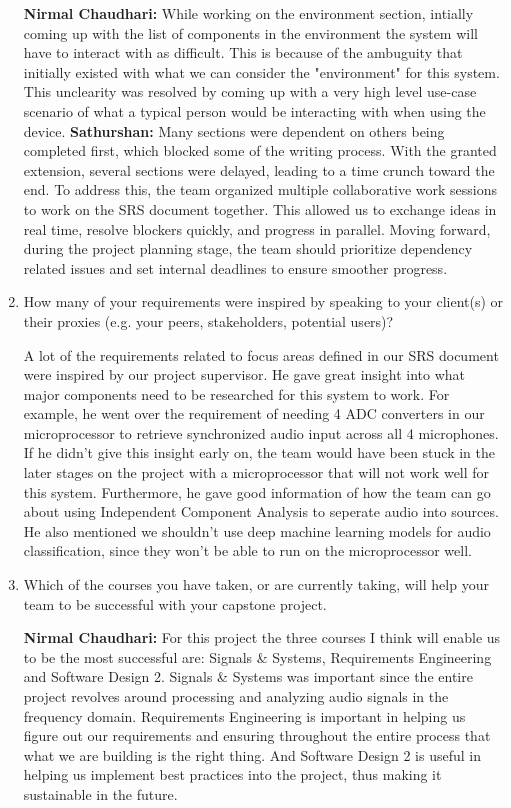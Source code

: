 \begin{enumerate}
  \textbf{Nirmal Chaudhari:} While working on the environment section, intially 
  coming up with the list of components in the environment the system will 
  have to interact with as difficult. This is because of the ambuguity that 
  initially existed with what we can consider the "environment" for this system.
  This unclearity was resolved by coming up with a very high level use-case 
  scenario of what a typical person would be interacting with when using the 
  device. 
  \textbf{Sathurshan:} Many sections were dependent on others being completed
  first, which blocked some of the writing process. With the granted extension,
  several sections were delayed, leading to a time crunch toward the end. To
  address this, the team organized multiple collaborative work sessions to work
  on the SRS document together. This allowed us to exchange ideas in real time,
  resolve blockers quickly, and progress in parallel. Moving forward, during
  the project planning stage, the team should prioritize dependency related
  issues and set internal deadlines to ensure smoother progress.

  \item How many of your requirements were inspired by speaking to your
  client(s) or their proxies (e.g. your peers, stakeholders, potential users)?

  A lot of the requirements related to focus areas defined in our SRS document 
  were inspired by our project supervisor. He gave great insight into what major
  components need to be researched for this system to work. For example, he went 
  over the requirement of needing 4 ADC converters in our microprocessor to 
  retrieve synchronized audio input across all 4 microphones. If he didn't give 
  this insight early on, the team would have been stuck in the later stages on 
  the project with a microprocessor that will not work well for this system. 
  Furthermore, he gave good information of how the team can go about using 
  Independent Component Analysis to seperate audio into sources. He also 
  mentioned we shouldn't use deep machine learning models for audio 
  classification, since they won't be able to run on the microprocessor well. 

  
  \item Which of the courses you have taken, or are currently taking, will help
  your team to be successful with your capstone project.

  \textbf{Nirmal Chaudhari: } For this project the three courses I think will 
  enable us to be the most successful are: Signals \& Systems, Requirements 
  Engineering and Software Design 2. Signals \& Systems was important since the 
  entire project revolves around processing and analyzing audio signals in the 
  frequency domain. Requirements Engineering is important in helping us figure 
  out our requirements and ensuring throughout the entire process that what we 
  are building is the right thing. And Software Design 2 is useful in helping 
  us implement best practices into the project, thus making it sustainable 
  in the future.


\end{enumerate}
